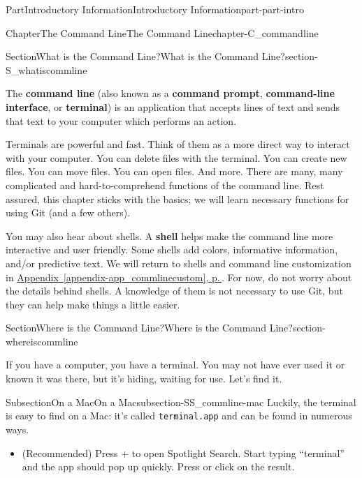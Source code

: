 \documentclass[twoside,10pt,]{book}
\newcommand{\xreffont}{\relax}
\newcommand{\mono}[1]{\texttt{#1}}
\newcommand{\terminology}[1]{\textbf{#1}}
\newcommand{\kbd}[1]{\keys{{#1}}}
\begin{document}
\begin{partptx}{Part}{Introductory Information}{}{Introductory Information}{}{}{part-part-intro}
\begin{chapterptx}{Chapter}{The Command Line}{}{The Command Line}{}{}{chapter-C_commandline}
\begin{sectionptx}{Section}{What is the Command Line?}{}{What is the Command Line?}{}{}{section-S_whatiscommline}
\par
The \terminology{command line} (also known as a \terminology{command prompt}, \terminology{command-line interface}, or \terminology{terminal}) is an application that accepts lines of text and sends that text to your computer which performs an action.%
\par
Terminals are powerful and fast. Think of them as a more direct way to interact with your computer. You can delete files with the terminal. You can create new files. You can move files. You can open files. And more. There are many, many complicated and hard-to-comprehend functions of the command line. Rest assured, this chapter sticks with the basics; we will learn necessary functions for using Git (and a few others).%
\par
You may also hear about shells. A \terminology{shell} helps make the command line more interactive and user friendly. Some shells add colors,  informative information, and\slash{}or predictive text. We will return to shells and command line customization in \hyperref[appendix-app_commlinecustom]{Appendix~{\xreffont\ref{appendix-app_commlinecustom}}, p.\,\pageref{appendix-app_commlinecustom}}. For now, do not worry about the details behind shells. A knowledge of them is not necessary to use Git, but they can help make things a little easier.%
\end{sectionptx}
%
%
\typeout{************************************************}
\typeout{************************************************}
%
\begin{sectionptx}{Section}{Where is the Command Line?}{}{Where is the Command Line?}{}{}{section-whereiscommline}
%
%
\begin{introduction}{}%
If you have a computer, you have a terminal. You may not have ever used it or known it was there, but it's hiding, waiting for use. Let's find it.%
\end{introduction}%
%
%
\typeout{************************************************}
\typeout{************************************************}
%
\begin{subsectionptx}{Subsection}{On a Mac}{}{On a Mac}{}{}{subsection-SS_commline-mac}
%
Luckily, the terminal is easy to find on a Mac: it's called \mono{terminal.app} and can be found in numerous ways.%
\begin{itemize}[label=\textbullet]
\item{}(Recommended) Press \kbd{Command} + \kbd{Space} to open Spotlight Search. Start typing ``terminal'' and the app should pop up quickly. Press \kbd{Enter} or click on the result.%

\end{itemize}
\end{subsectionptx}
\end{sectionptx}
\end{chapterptx}
\end{partptx}
\end{document}
